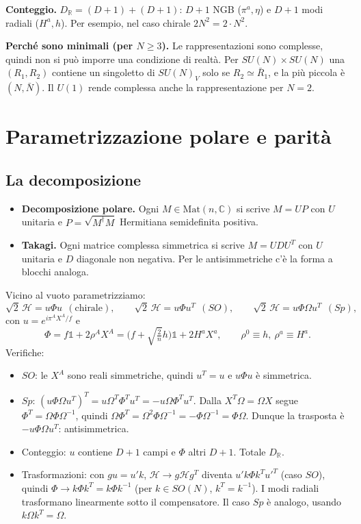 \documentclass[11pt,a4paper]{article}
\numberwithin{equation}{section}
\theoremstyle{remark}
\newcommand{\Hf}{\mathcal{H}}
\newcommand{\one}{\mathbb{1}}
\newcommand{\R}{\mathbb{R}}
\newcommand{\C}{\mathbb{C}}
\begin{document}
\textbf{Conteggio.} $D_\R=(D+1)+(D+1)$: $D+1$ NGB ($\pi^a,\eta$) e $D+1$ modi radiali ($H^a,h$). Per esempio, nel caso chirale $2N^2=2\cdot N^2$.

\textbf{Perché sono minimali (per $N\ge3$).} Le rappresentazioni sono complesse, quindi non si può imporre una condizione di realtà. Per $SU(N)\times SU(N)$ una $(R_1,R_2)$ contiene un singoletto di $SU(N)_V$ solo se $R_2\simeq\bar R_1$, e la più piccola è $(N,\bar N)$. Il $U(1)$ rende complessa anche la rappresentazione per $N=2$.

\section{Parametrizzazione polare e parità}
\label{sec:polar}

\subsection{La decomposizione}

\begin{itemize}
\item \textbf{Decomposizione polare.} Ogni $M\in\mathrm{Mat}(n,\C)$ si scrive $M=U P$ con $U$ unitaria e $P=\sqrt{M^\dagger M}$ Hermitiana semidefinita positiva.
\item \textbf{Takagi.} Ogni matrice complessa simmetrica si scrive $M=UDU^T$ con $U$ unitaria e $D$ diagonale non negativa. Per le antisimmetriche c'è la forma a blocchi analoga.
\end{itemize}
Vicino al vuoto parametrizziamo:
\begin{equation}
\sqrt2\,\Hf=u\Phi u\ \ (\text{chirale}),\qquad \sqrt2\,\Hf=u\Phi u^T\ \ (SO),\qquad\sqrt2\,\Hf=u\Phi\Omega u^T\ \ (Sp),
\label{eq:polar}
\end{equation}
con $u=e^{i\pi^AX^A/f}$ e
\begin{equation}
\Phi=f\one+2\rho^AX^A=\Big(f+\sqrt{\tfrac2n}h\Big)\one+2H^aX^a,\qquad \rho^0\equiv h,\ \rho^a\equiv H^a .
\label{eq:Phi}
\end{equation}
Verifiche:
\begin{itemize}
\item $SO$: le $X^A$ sono reali simmetriche, quindi $u^T=u$ e $u\Phi u$ è simmetrica. \checkmark
\item $Sp$: $(u\Phi\Omega u^T)^T=u\Omega^T\Phi^Tu^T=-u\Omega\Phi^Tu^T$. Dalla $X^T\Omega=\Omega X$ segue $\Phi^T=\Omega\Phi\Omega^{-1}$, quindi $\Omega\Phi^T=\Omega^2\Phi\Omega^{-1}=-\Phi\Omega^{-1}=\Phi\Omega$. Dunque la trasposta è $-u\Phi\Omega u^T$: antisimmetrica. \checkmark
\item Conteggio: $u$ contiene $D+1$ campi e $\Phi$ altri $D+1$. Totale $D_\R$. \checkmark
\item Trasformazioni: con $gu=u'k$, $\Hf\to g\Hf g^T$ diventa $u'k\Phi k^T u'^T$ (caso $SO$), quindi $\Phi\to k\Phi k^T=k\Phi k^{-1}$ (per $k\in SO(N)$, $k^T=k^{-1}$). I modi radiali trasformano linearmente sotto il compensatore. Il caso $Sp$ è analogo, usando $k\Omega k^T=\Omega$.
\end{itemize}
\end{document}
